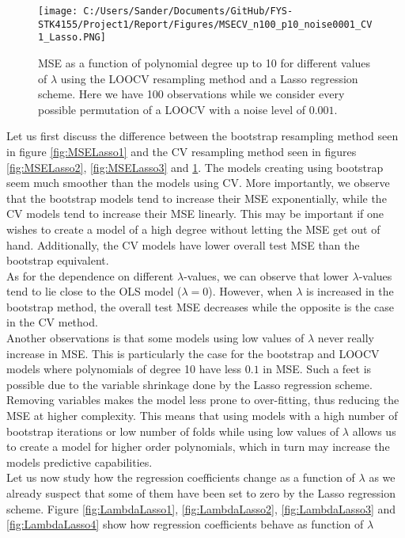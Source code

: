 \documentclass[12pt,a4paper]{article}
\begin{document}
\begin{figure}[H]
\centering
\texttt{[image: C:/Users/Sander/Documents/GitHub/FYS-STK4155/Project1/Report/Figures/MSECV\_n100\_p10\_noise0001\_CV1\_Lasso.PNG]}
\caption{\label{fig:MSELasso4} MSE as a function of polynomial degree up to 10 for different values of $\lambda$ using the LOOCV resampling method and a Lasso regression scheme. Here we have 100 observations while we consider every possible permutation of a LOOCV with a noise level of $0.001$.}
\end{figure}

\noindent Let us first discuss the difference between the bootstrap resampling method seen in figure \ref{fig:MSELasso1} and the CV resampling method seen in figures \ref{fig:MSELasso2}, \ref{fig:MSELasso3} and \ref{fig:MSELasso4}. The models creating using bootstrap seem much smoother than the models using CV. More importantly, we observe that the bootstrap models tend to increase their MSE exponentially, while the CV models tend to increase their MSE linearly. This may be important if one wishes to create a model of a high degree without letting the MSE get out of hand. Additionally, the CV models have lower overall test MSE than the bootstrap equivalent. 
\\
As for the dependence on different $\lambda$-values, we can observe that lower $\lambda$-values tend to lie close to the OLS model ($\lambda = 0$). However, when $\lambda$ is increased in the bootstrap method, the overall test MSE decreases while the opposite is the case in the CV method. 
\\
Another observations is that some models using low values of $\lambda$ never really increase in MSE. This is particularly the case for the bootstrap and LOOCV models where polynomials of degree 10 have less $0.1$ in MSE. Such a feet is possible due to the variable shrinkage done by the Lasso regression scheme. Removing variables makes the model less prone to over-fitting, thus reducing the MSE at higher complexity. This means that using models with a high number of bootstrap iterations or low number of folds while using low values of $\lambda$ allows us to create a model for higher order polynomials, which in turn may increase the models predictive capabilities.
\\
Let us now study how the regression coefficients change as a function of $\lambda$ as we already suspect that some of them have been set to zero by the Lasso regression scheme. Figure \ref{fig:LambdaLasso1}, \ref{fig:LambdaLasso2}, \ref{fig:LambdaLasso3} and \ref{fig:LambdaLasso4} show how regression coefficients behave as function of $\lambda$
\end{document}
